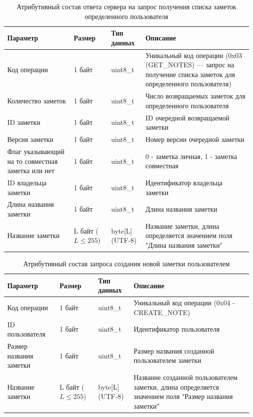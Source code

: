 \begin{table}[H]
    \centering
    \caption{Атрибутивный состав ответа сервера на запрос получения списка заметок определенного пользователя}
    \begin{tabular}{|p{4cm}|p{2cm}|p{3cm}|p{6cm}|}
    \hline
    \textbf{Параметр} & \textbf{Размер} & \textbf{Тип данных} & \textbf{Описание} \\ \hline
    Код операции & 1 байт & uint8\_t & Уникальный код операции (0x03 (GET\_NOTES) — запрос на получение списка заметок для определенного пользователя) \\ \hline
    Количество заметок & 1 байт & uint8\_t & Число возвращаемых заметок для определенного пользователя \\ \hline
    ID заметки & 1 байт & uint8\_t & ID очередной возвращаемой заметки \\ \hline
    Версия заметки & 1 байт & uint8\_t & Номер версии очередной заметки \\ \hline
    Флаг указывающий на то совместная заметка или нет & 1 байт & uint8\_t & 0 - заметка личная, 1 - заметка совместная \\ \hline 
    ID владельца заметки & 1 байт & uint8\_t & Идентификатор владельца заметки \\ \hline
    Длина названия заметки & 1 байт & uint8\_t & Длина названия заметки \\ \hline
    Название заметки & L байт (\(L \le 255\)) & byte[L] (UTF-8) & Название заметки, длина определяется значением поля "Длина названия заметки" \\ \hline
    \end{tabular}
    \label{tab:note_create_request}
\end{table}


\begin{table}[H]
    \centering
    \caption{Атрибутивный состав запроса создания новой заметки пользователем}
    \begin{tabular}{|p{4cm}|p{2cm}|p{3cm}|p{6cm}|}
    \hline
    \textbf{Параметр} & \textbf{Размер} & \textbf{Тип данных} & \textbf{Описание} \\ \hline
    Код операции & 1 байт & uint8\_t & Уникальный код операции (0x04 - CREATE\_NOTE) \\ \hline
    ID пользователя & 1 байт & uint8\_t & Идентификатор пользователя \\ \hline
    Размер названия заметки & 1 байт & uint8\_t & Размер названия созданной пользователем заметки \\ \hline
    Название заметки & L байт (\(L \le 255\)) & byte[L] (UTF-8) & Название созданной пользователем заметки, длина определяется значением поля "Размер названия заметки" \\ \hline
    \end{tabular}
    \label{tab:note_create_request}
\end{table}


